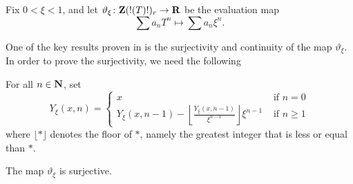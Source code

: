 %
%

\begin{definition}
  \label{theta}
  \leanok
  Fix $0<\xi <1$, and let $\vartheta_{\xi}\colon \mathbf{Z}(!(T)!)_r\rightarrow \mathbf{R}$ be the evaluation map
  \[
    \sum a_nT^n\longmapsto \sum a_n\xi^n.
  \]
\end{definition}

One of the key results proven in \cite[\S 6]{Analytic} is the surjectivity and continuity of the map $\vartheta_\xi$. In order to prove the surjectivity, we need the following
 \begin{definition}
  \label{theta.y}
  \leanok
	For all $n\in\mathbf{N}$, set
	\[
		Y_\xi(x, n)=
		\begin{cases}
			x&\text{ if } n = 0 \\
			Y_\xi(x,n-1) - \left\lfloor \frac{Y_\xi(x,n-1)}{\xi^{n-1}} \right\rfloor \xi^{n-1} & \text{ if } n \ge 1
		\end{cases}
	\]
where $\lfloor \ast \rfloor$ denotes the floor of $\ast$, namely the greatest integer that is less or equal than $\ast$.
\end{definition}

\begin{lemma}
  \label{theta.surjective}
  \leanok
  The map $\vartheta_{\xi}$ is surjective.
\end{lemma}

